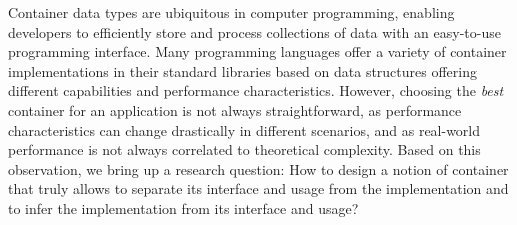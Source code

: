 Container data types are ubiquitous in computer programming, enabling developers to efficiently store and process collections of data with an easy-to-use programming interface.
Many programming languages offer a variety of container implementations in their standard libraries based on data structures offering different capabilities and performance characteristics.
However, choosing the \emph{best} container for an application is not always straightforward, as performance characteristics can change drastically in different scenarios, and as real-world performance is not always correlated to theoretical complexity. Based on this observation, we bring up a research question: How to design a notion of container that truly allows to separate its interface and usage from the implementation and to infer the implementation from its interface and usage?

